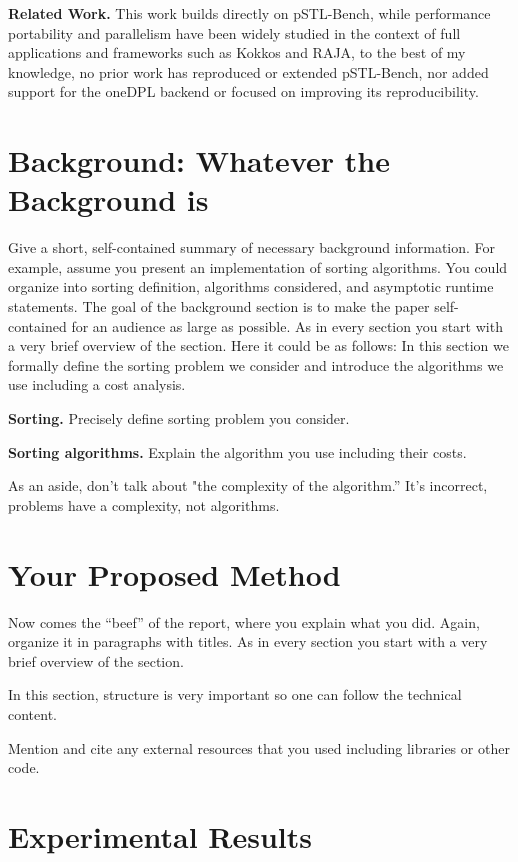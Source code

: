 \documentclass[conference]{IEEEtran}
\newcommand{\mypar}[1]{{\bf #1.}}
\begin{document}
\mypar{Related Work} This work builds directly on pSTL-Bench,
while performance portability and parallelism have been widely studied in
the context of full applications and frameworks such as Kokkos\cite{Kokkos}
and RAJA\cite{RAJA}, to the best of my knowledge, no prior work has reproduced or
extended pSTL-Bench, nor added support for the oneDPL backend or focused on improving
its reproducibility.

\section{Background: Whatever the Background is}\label{sec:background}

Give a short, self-contained summary of necessary background information. For
example, assume you present an implementation of sorting algorithms. You could
organize into sorting definition, algorithms considered, and asymptotic runtime
statements. The goal of the background section is to make the paper
self-contained for an audience as large as possible. As in every section you
start with a very brief overview of the section. Here it could be as follows:
In this section we formally define the sorting problem we consider and
introduce the algorithms we use including a cost analysis.

\mypar{Sorting}
Precisely define sorting problem you consider.

\mypar{Sorting algorithms}
Explain the algorithm you use including their costs.

As an aside, don't talk about "the complexity of the algorithm.'' It's
incorrect, problems have a complexity, not algorithms.

\section{Your Proposed Method}\label{sec:yourmethod}

Now comes the ``beef'' of the report, where you explain what you did. Again,
organize it in paragraphs with titles. As in every section you start with a
very brief overview of the section.

In this section, structure is very important so one can follow the technical
content.

Mention and cite any external resources that you used including libraries or
other code.

\section{Experimental Results}\label{sec:exp}
\end{document}
